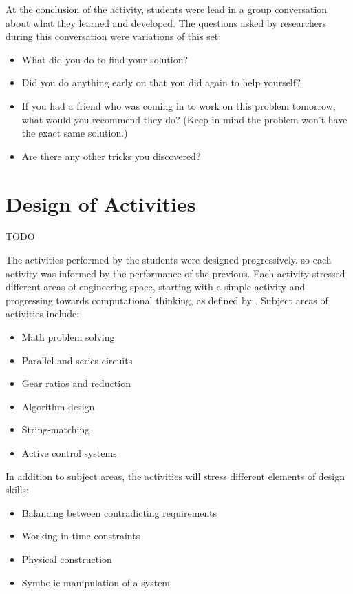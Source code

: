 At the conclusion of the activity, students were lead in a group conversation about what they learned and developed. The questions asked by researchers during this conversation were variations of this set:
\begin{itemize}
\item What did you do to find your solution?
\item Did you do anything early on that you did again to help yourself?
\item If you had a friend who was coming in to work on this problem tomorrow,
what would you recommend they do? (Keep in mind the problem won't
have the exact same solution.)
\item Are there any other tricks you discovered?
\end{itemize}


\section{Design of Activities} TODO

The activities performed by the students were designed progressively, so each activity was informed by the performance of the previous. Each activity stressed different areas of engineering space, starting with a simple activity and progressing towards computational thinking, as defined by \citet{p33-wing}.
Subject areas of activities include:
\begin{itemize}
\item Math problem solving
\item Parallel and series circuits
\item Gear ratios and reduction
\item Algorithm design
\item String-matching 
\item Active control systems
\end{itemize}
In addition to subject areas, the activities will stress different
elements of design skills:
\begin{itemize}
\item Balancing between contradicting requirements
\item Working in time constraints
\item Physical construction
\item Symbolic manipulation of a system
\end{itemize}

